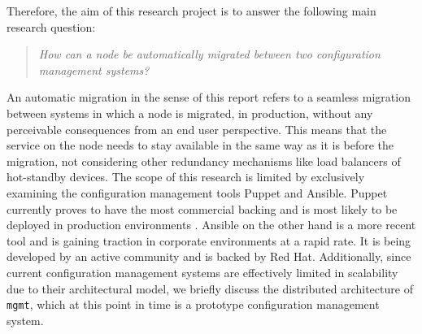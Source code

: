 Therefore, the aim of this research project is to answer the following main research question:

\begin{quote}
\textit{How can a node be automatically migrated between two configuration management systems?}
\end{quote}

\noindent
An automatic migration in the sense of this report refers to a seamless migration between systems in which a node is migrated, in production, without any perceivable consequences from an end user perspective. This means that the service on the node needs to stay available in the same way as it is before the migration, not considering other redundancy mechanisms like load balancers of hot-standby devices. The scope of this research is limited by exclusively examining the configuration management tools Puppet and Ansible. Puppet currently proves to have the most commercial backing and is most likely to be deployed in production environments \cite{tecosystems_2013}. Ansible on the other hand is a more recent tool and is gaining traction in corporate environments at a rapid rate. It is being developed by an active community and is backed by Red Hat. Additionally, since current configuration management systems are effectively limited in scalability due to their architectural model, we briefly discuss the distributed architecture of \texttt{mgmt}, which at this point in time is a prototype configuration management system.
